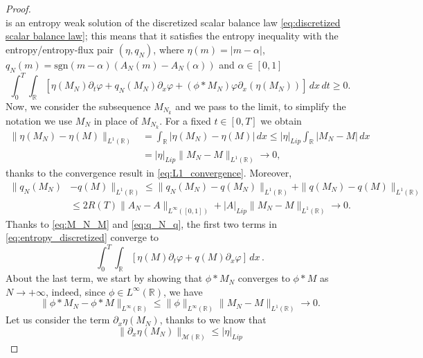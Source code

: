 \documentclass[11pt,a4paper,oneside]{amsart}
\newcommand\R{\mathbb{R}}
\newcommand{\sgn}{\text{sgn}}
\begin{document}
\begin{proof}
$$        $$
        is an entropy weak solution of the discretized scalar balance law \eqref{eq:discretized scalar balance law}; 
        this means that it satisfies the entropy inequality with the entropy/entropy-flux pair $(\eta,q_N)$, 
        where $\eta(m)=|m-\alpha|$, $q_N(m)=\sgn(m-\alpha)(A_N(m)-A_N(\alpha))$ and $\alpha\in[0,1]$
        \begin{equation}\label{eq:entropy_discretized}
            \int_0^T\int_\R [\eta(M_N)\partial_t\varphi+q_N(M_N)\partial_x\varphi+(\phi\ast M_N)\varphi\partial_x(\eta(M_N))]\,dx\,dt\geq0.
        \end{equation}
        Now, we consider the subsequence $M_{N_k}$ and we pass to the limit, to simplify the notation we use $M_N$ in place of 
        $M_{N_k}$. For a fixed $t\in[0,T]$ we obtain
        \begin{equation}\label{eq:M_N_M}
            \begin{aligned}
        \|\eta(M_N)-\eta(M)\|_{L^1(\R)}&=\int_\R |\eta(M_N)-\eta(M)|\,dx\leq |\eta|_{Lip}\int_\R |M_N-M|\,dx\\
        &=|\eta|_{Lip}\|M_N-M\|_{L^1(\R)}\to0,
        \end{aligned}
        \end{equation}
        thanks to the convergence result in \eqref{eq:L1_convergence}. Moreover,
        \begin{equation}\label{eq:q_N_q}
            \begin{aligned}
            \|q_N(M_N)&-q(M)\|_{L^1(\R)}  \leq \|q_N(M_N)-q(M_N)\|_{L^1(\R)}+\|q(M_N)-q(M)\|_{L^1(\R)}\\
            &\leq 2R(T)\|A_N-A\|_{L^\infty([0,1])}+|A|_{Lip}\|M_N-M\|_{L^1(\R)}\to0.
        \end{aligned}
        \end{equation}
         Thanks to \eqref{eq:M_N_M} and \eqref{eq:q_N_q}, the first two terms in \eqref{eq:entropy_discretized} converge to
\begin{equation*}
            \int_0^T\int_\R [\eta(M)\partial_t\varphi+q(M)\partial_x\varphi]\,dx\,.
\end{equation*}
About the last term, we start by showing that  $\phi\ast M_N$ converges to $\phi\ast M$ as $N\to +\infty$, 
indeed, since $\phi\in L^\infty(\R)$, we have
        $$
        \|\phi\ast M_N-\phi\ast M\|_{L^\infty(\R)} \leq \|\phi\|_{L^\infty(\R)}\|M_N-M\|_{L^1(\R)}\to 0.
        $$
       Let us consider the term $\partial_x\eta(M_N)$, thanks to \cite[Lemma 5.2]{Leslie-Tan} we know that
        $$
        \|\partial_x\eta(M_N)\|_{\mathcal{M}(\R)} \leq |\eta|_{Lip}
$$
\end{proof}
\end{document}
